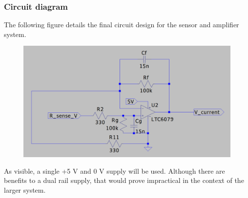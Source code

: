 \subsubsection{Circuit diagram}\label{sec:current_sensor_circuit}
The following figure details the final circuit design for the sensor and amplifier system.

\begin{figure}[h!]
  \centering
  \includegraphics[width=.8\linewidth]{Figures/Circuit}
  \label{fig:circuit-diagram}
\end{figure}

As visible, a single +5 V and 0 V supply will be used. Although there are benefits to a dual rail supply, that would prove impractical in the context of the larger system.

\pagebreak
